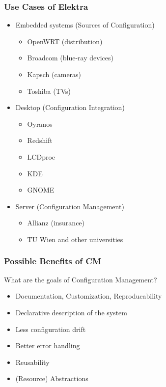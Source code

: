 \begin{frame}
	\frametitle{Use Cases of Elektra}
	\begin{itemize}[<+->]
	\item Embedded systems (Sources of Configuration)
	\begin{itemize}
	\item OpenWRT (distribution)
	\item Broadcom (blue-ray devices)
	\item Kapsch (cameras)
	\item Toshiba (TVs)
	\end{itemize}
	\item Desktop (Configuration Integration)
	\begin{itemize}
	\item Oyranos
	\item Redshift
	\item LCDproc
	\item KDE
	\item GNOME
	\end{itemize}
	\item Server (Configuration Management)
	\begin{itemize}
	\item Allianz (insurance)
	\item TU Wien and other universities
	\end{itemize}
	\end{itemize}
\end{frame}

\begin{frame}
	\frametitle{Possible Benefits of CM}

	\begin{task}
	What are the goals of Configuration Management?
	\end{task}

	\pause

	\begin{itemize} %
	\item Documentation, Customization, Reproducability
	\item Declarative description of the system
	\item Less configuration drift
	\item Better error handling
	\item Reusability
	\item (Resource) Abstractions
	\end{itemize}
\end{frame}

